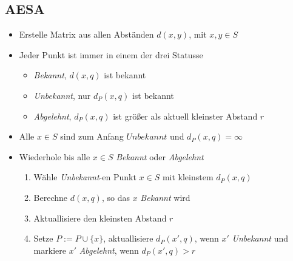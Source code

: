 \documentclass[deutsch,runningheads,a4paper]{llncs}
\begin{document}
  \subsection{AESA}
    \begin{itemize}
      \item Erstelle Matrix aus allen Abständen $d(x, y)$, mit $x, y \in S$
      \item Jeder Punkt ist immer in einem der drei Statusse
      \begin{itemize}
      \item \textit{Bekannt}, $d(x, q)$ ist bekannt
      \item \textit{Unbekannt}, nur $d_P(x, q)$ ist bekannt
      \item \textit{Abgelehnt}, $d_P(x, q)$ ist größer als aktuell kleinster Abstand $r$
      \end{itemize}
      \item Alle $x \in S$ sind zum Anfang $Unbekannt$ und $d_P(x, q) = \infty$
      \item Wiederhole bis alle $x \in S$ \textit{Bekannt} oder \textit{Abgelehnt}
      \begin{enumerate}
      \item Wähle \textit{Unbekannt}-en Punkt $x \in S$ mit kleinstem $d_P(x, q)$
      \item Berechne $d(x,q)$, so das $x$ \textit{Bekannt} wird
      \item Aktuallisiere den kleinsten Abstand $r$
      \item Setze $P:= P \cup \{x\}$, aktuallisiere $d_P(x', q)$, wenn $x'$ \textit{Unbekannt} und markiere $x'$ \textit{Abgelehnt}, wenn $d_P(x', q) > r$
      \end{enumerate}
    \end{itemize}
  {}
  
\end{document}
